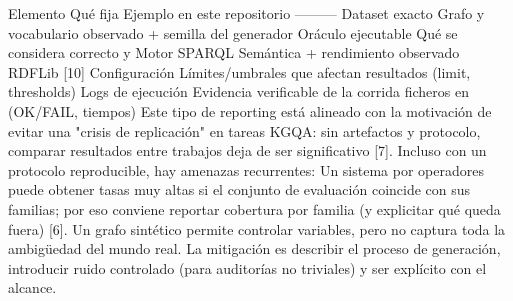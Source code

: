 {}\markdownRendererInterblockSeparator
{}\markdownRendererPipe{} Elemento \markdownRendererPipe{} Qué fija \markdownRendererPipe{} Ejemplo en este repositorio \markdownRendererPipe{} \markdownRendererPipe{}---\markdownRendererPipe{}---\markdownRendererPipe{}---\markdownRendererPipe{} \markdownRendererPipe{} Dataset exacto \markdownRendererPipe{} Grafo y vocabulario observado \markdownRendererPipe{}  + semilla del generador \markdownRendererPipe{} \markdownRendererPipe{} Oráculo ejecutable \markdownRendererPipe{} Qué se considera correcto \markdownRendererPipe{}  y  \markdownRendererPipe{} \markdownRendererPipe{} Motor SPARQL \markdownRendererPipe{} Semántica + rendimiento observado \markdownRendererPipe{} RDFLib [10] \markdownRendererPipe{} \markdownRendererPipe{} Configuración \markdownRendererPipe{} Límites/umbrales que afectan resultados \markdownRendererPipe{}  (limit, thresholds) \markdownRendererPipe{} \markdownRendererPipe{} Logs de ejecución \markdownRendererPipe{} Evidencia verificable de la corrida \markdownRendererPipe{} ficheros en  (OK/FAIL, tiempos) \markdownRendererPipe{}\markdownRendererInterblockSeparator
{}Este tipo de reporting está alineado con la motivación de evitar una "crisis de replicación" en tareas KGQA: sin artefactos y protocolo, comparar resultados entre trabajos deja de ser significativo [7].\markdownRendererInterblockSeparator
{}\markdownRendererInterblockSeparator
{}Incluso con un protocolo reproducible, hay amenazas recurrentes:\markdownRendererInterblockSeparator
{}\markdownRendererUlBeginTight
\markdownRendererUlItem {} Un sistema por operadores puede obtener tasas muy altas si el conjunto de evaluación coincide con sus familias; por eso conviene reportar cobertura por familia (y explicitar qué queda fuera) [6].\markdownRendererUlItemEnd 
\markdownRendererUlItem {} Un grafo sintético permite controlar variables, pero no captura toda la ambigüedad del mundo real. La mitigación es describir el proceso de generación, introducir ruido controlado (para auditorías no triviales) y ser explícito con el alcance.\markdownRendererUlItemEnd 
